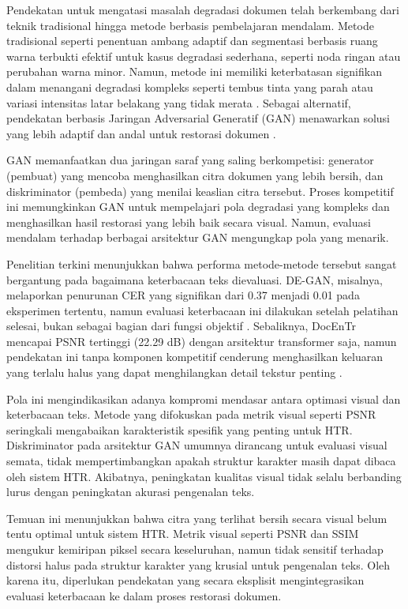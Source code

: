 \documentclass[12pt,a4paper]{article}
\begin{document}
Pendekatan untuk mengatasi masalah degradasi dokumen telah berkembang dari teknik tradisional hingga metode berbasis pembelajaran mendalam. Metode tradisional seperti penentuan ambang adaptif \parencite{sauvola2000, otsu1979} dan segmentasi berbasis ruang warna terbukti efektif untuk kasus degradasi sederhana, seperti noda ringan atau perubahan warna minor. Namun, metode ini memiliki keterbatasan signifikan dalam menangani degradasi kompleks seperti tembus tinta yang parah atau variasi intensitas latar belakang yang tidak merata \parencite{souibgui2021degan}. Sebagai alternatif, pendekatan berbasis Jaringan Adversarial Generatif (GAN) menawarkan solusi yang lebih adaptif dan andal untuk restorasi dokumen \parencite{goodfellow2014}.


GAN memanfaatkan dua jaringan saraf yang saling berkompetisi: generator (pembuat) yang mencoba menghasilkan citra dokumen yang lebih bersih, dan diskriminator (pembeda) yang menilai keaslian citra tersebut. Proses kompetitif ini memungkinkan GAN untuk mempelajari pola degradasi yang kompleks dan menghasilkan hasil restorasi yang lebih baik secara visual. Namun, evaluasi mendalam terhadap berbagai arsitektur GAN mengungkap pola yang menarik.


Penelitian terkini menunjukkan bahwa performa metode-metode tersebut sangat bergantung pada bagaimana keterbacaan teks dievaluasi. DE-GAN, misalnya, melaporkan penurunan CER yang signifikan dari 0.37 menjadi 0.01 pada eksperimen tertentu, namun evaluasi keterbacaan ini dilakukan setelah pelatihan selesai, bukan sebagai bagian dari fungsi objektif \parencite{souibgui2021degan}. Sebaliknya, DocEnTr mencapai PSNR tertinggi (22.29 dB) dengan arsitektur transformer saja, namun pendekatan ini tanpa komponen kompetitif cenderung menghasilkan keluaran yang terlalu halus yang dapat menghilangkan detail tekstur penting \parencite{docentr2022}.


Pola ini mengindikasikan adanya kompromi mendasar antara optimasi visual dan keterbacaan teks. Metode yang difokuskan pada metrik visual seperti PSNR seringkali mengabaikan karakteristik spesifik yang penting untuk HTR. Diskriminator pada arsitektur GAN umumnya dirancang untuk evaluasi visual semata, tidak mempertimbangkan apakah struktur karakter masih dapat dibaca oleh sistem HTR. Akibatnya, peningkatan kualitas visual tidak selalu berbanding lurus dengan peningkatan akurasi pengenalan teks.


Temuan ini menunjukkan bahwa citra yang terlihat bersih secara visual belum tentu optimal untuk sistem HTR. Metrik visual seperti PSNR dan SSIM mengukur kemiripan piksel secara keseluruhan, namun tidak sensitif terhadap distorsi halus pada struktur karakter yang krusial untuk pengenalan teks. Oleh karena itu, diperlukan pendekatan yang secara eksplisit mengintegrasikan evaluasi keterbacaan ke dalam proses restorasi dokumen.
\end{document}
